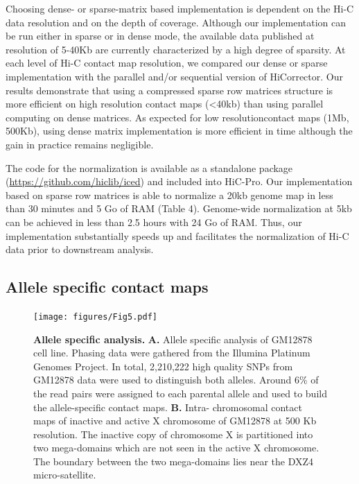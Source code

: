 Choosing dense- or sparse-matrix based implementation is dependent on the Hi-C
data resolution and on the depth of coverage. Although our implementation can
be run either in sparse or in dense mode, the available data published at
resolution of 5-40Kb are currently characterized by a high degree of sparsity.
At each level of Hi-C contact map resolution, we compared our dense or sparse
implementation with the parallel and/or sequential version of HiCorrector. Our
results demonstrate that using a compressed sparse row matrices structure is
more efficient on high resolution contact maps (<40kb) than using parallel
computing on dense matrices. As expected for low resolutioncontact maps (1Mb,
500Kb), using dense matrix implementation is more efficient in time although
the gain in practice remains negligible.

The code for the normalization is available as a standalone package
(\href{https://github.com/hiclib/iced}{https://github.com/hiclib/iced}) and
included into HiC-Pro. Our implementation based on sparse row matrices is able
to normalize a 20kb genome map in less than 30 minutes and 5 Go of RAM (Table
4). Genome-wide normalization at 5kb can be achieved in less than 2.5 hours
with 24 Go of RAM. Thus, our implementation substantially speeds up and
facilitates the normalization of Hi-C data prior to downstream analysis.

\subsection{Allele specific contact maps}

\begin{figure}
\texttt{[image: figures/Fig5.pdf]}
\caption{\textbf{Allele specific analysis.} \textbf{A.} Allele specific analysis of
GM12878 cell line. Phasing data were gathered from the Illumina Platinum
Genomes Project. In total, 2,210,222 high quality SNPs from GM12878 data were
used to distinguish both alleles. Around 6\% of the read pairs were assigned to
each parental allele and used to build the allele-specific contact maps.
\textbf{B.}
Intra- chromosomal contact maps of inactive and active X chromosome of GM12878
at 500 Kb resolution. The inactive copy of chromosome X is partitioned into
two mega-domains which are not seen in the active X chromosome. The boundary
between the two mega-domains lies near the DXZ4 micro-satellite.}
\label{fig:fig5}
\end{figure}



